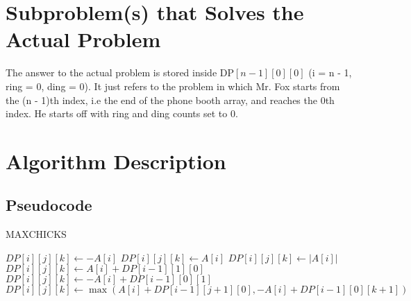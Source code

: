 \documentclass{article}
\begin{document}
\section{Subproblem(s) that Solves the Actual Problem}

The answer to the actual problem is stored inside $\text{DP}[n - 1][0][0] $ (i = n - 1, ring = 0, ding = 0). It just refers to the problem in which Mr. Fox starts from the (n - 1)th index, i.e the end of the phone booth array, and reaches the 0th index. He starts off with ring and ding counts set to 0.

\newpage

\section{Algorithm Description}

\subsection{Pseudocode}
\begin{algorithm}
\caption{MAXCHICKS}
\begin{algorithmic}[1]
             
                 
                     
                        \State $DP[i][j][k] \gets -A[i]$
                     
                        \State $DP[i][j][k] \gets A[i]$
                    \Else
                        \State $DP[i][j][k] \gets \lvert A[i] \rvert$ 
                    \EndIf
                \EndFor
            \EndFor
        \Else
             
                 
                     
                        \State $DP[i][j][k] \gets A[i] + DP[i - 1][1][0]$
                     
                        \State $DP[i][j][k] \gets -A[i] + DP[i - 1][0][1]$
                    \Else
                        \State $DP[i][j][k] \gets \max(A[i] + DP[i - 1][j + 1][0], -A[i] + DP[i - 1][0][k + 1])$
                    \EndIf
                \EndFor
            \EndFor
        \EndIf
    \EndFor
\endProcedure
\end{algorithmic}
\end{algorithm}
\end{document}
